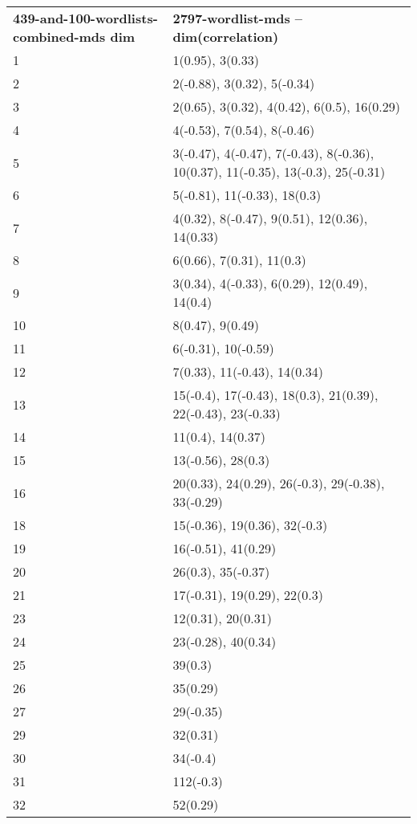 \begin{table}[!tbp]
    \begin{tabular}{| p{0.75in}p{3.5in} |}
        \hline
        \textbf{439-and-100-wordlists-combined-mds dim} & \textbf{2797-wordlist-mds -- dim(correlation)}\\
        1 & 1(0.95), 3(0.33)\\
        2 & 2(-0.88), 3(0.32), 5(-0.34)\\
        3 & 2(0.65), 3(0.32), 4(0.42), 6(0.5), 16(0.29)\\
        4 & 4(-0.53), 7(0.54), 8(-0.46)\\
        5 & 3(-0.47), 4(-0.47), 7(-0.43), 8(-0.36), 10(0.37), 11(-0.35), 13(-0.3), 25(-0.31)\\
        6 & 5(-0.81), 11(-0.33), 18(0.3)\\
        7 & 4(0.32), 8(-0.47), 9(0.51), 12(0.36), 14(0.33)\\
        8 & 6(0.66), 7(0.31), 11(0.3)\\
        9 & 3(0.34), 4(-0.33), 6(0.29), 12(0.49), 14(0.4)\\
        10 & 8(0.47), 9(0.49)\\
        11 & 6(-0.31), 10(-0.59)\\
        12 & 7(0.33), 11(-0.43), 14(0.34)\\
        13 & 15(-0.4), 17(-0.43), 18(0.3), 21(0.39), 22(-0.43), 23(-0.33)\\
        14 & 11(0.4), 14(0.37)\\
        15 & 13(-0.56), 28(0.3)\\
        16 & 20(0.33), 24(0.29), 26(-0.3), 29(-0.38), 33(-0.29)\\
        18 & 15(-0.36), 19(0.36), 32(-0.3)\\
        19 & 16(-0.51), 41(0.29)\\
        20 & 26(0.3), 35(-0.37)\\
        21 & 17(-0.31), 19(0.29), 22(0.3)\\
        23 & 12(0.31), 20(0.31)\\
        24 & 23(-0.28), 40(0.34)\\
        25 & 39(0.3)\\
        26 & 35(0.29)\\
        27 & 29(-0.35)\\
        29 & 32(0.31)\\
        30 & 34(-0.4)\\
        31 & 112(-0.3)\\
        32 & 52(0.29)\\

\end{tabular}
\end{table}
